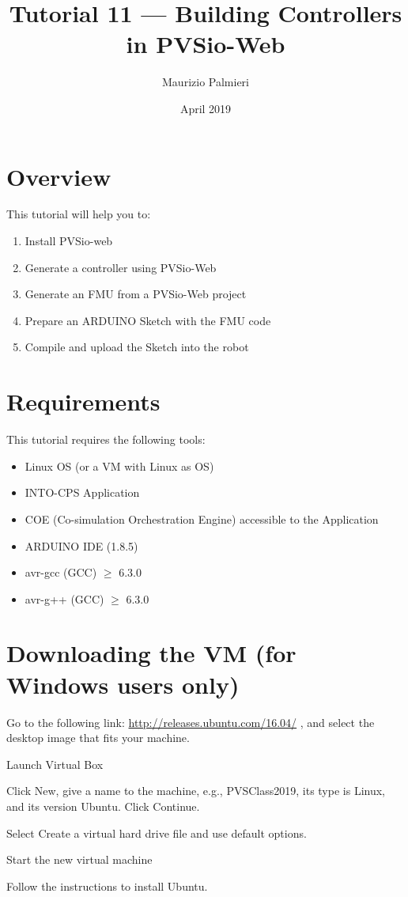 \documentclass[11pt,a4paper]{../tutorial}
\title{Tutorial 11 --- Building Controllers in PVSio-Web}
\date{April 2019}
\author{Maurizio Palmieri}
\begin{document}
\section*{Overview}

This tutorial will help you to:

\begin{enumerate}[noitemsep]
\item Install PVSio-web
\item Generate a  controller using PVSio-Web
\item Generate an FMU from a PVSio-Web project
\item Prepare an ARDUINO Sketch with the FMU code
\item Compile and upload the Sketch into the robot
\end{enumerate}

\section*{Requirements}

This tutorial requires the following tools:

\begin{itemize}[noitemsep]
\item Linux OS (or a VM with Linux as OS)
\item INTO-CPS Application
\item COE (Co-simulation Orchestration Engine) accessible to the Application
\item ARDUINO IDE (1.8.5)
\item avr-gcc (GCC) $\geq$ 6.3.0
\item avr-g++ (GCC) $\geq$ 6.3.0

\end{itemize}




\section{Downloading the VM (for Windows users only)}
\begin{instructions}
\item Go to the following link: \url{http://releases.ubuntu.com/16.04/} , and select the desktop image that fits your machine.
\item Launch Virtual Box
\item Click New, give a name to the machine, e.g., PVSClass2019, its type is Linux, and its version Ubuntu. Click Continue.
\item Select Create a virtual hard drive file and use default options.
\item  Start the new virtual machine
\item Follow the instructions to install Ubuntu.

\end{instructions}
\end{document}
